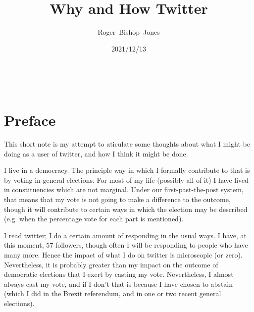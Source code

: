 \documentclass[10pt,titlepage]{article}
\title{\LARGE\bf Why and How Twitter}
\author{Roger~Bishop~Jones}
\date{\small 2021/12/13}
\newcommand{\ignore}[1]{}
\begin{document}
                               
\begin{titlepage}
\maketitle





\end{titlepage}

\ \

\ignore{
\begin{centering}
{}
\end{centering}
}%

\setcounter{tocdepth}{2}
{\parskip-0pt\tableofcontents}


\pagebreak

\section*{Preface}


This short note is my attempt to aticulate some thoughts about what I might be doing as a user of twitter, and how I think it might be done.

I live in a democracy.
The principle way in which I formally contribute to that is by voting in general elections.
For most of my life (possibly all of it) I have lived in constituencies which are not marginal.
Under our first-past-the-post system, that means that my vote is not going to make a difference to the outcome, though it will contribute to certain ways in which the election may be described (e.g. when the percentage vote for each part is mentioned).

I read twitter;  I do a certain amount of responding in the usual ways.
I have, at this moment, 57 followers, though often I will be responding to people who have many more.
Hence the impact of what I do on twitter is microscopic (or zero).
Nevertheless, it is probably greater than my impact on the outcome of democratic elections that I exert by casting my vote.
Nevertheless, I almost always cast my vote, and if I don't that is because I have chosen to abstain (which I did in the Brexit referendum, and in one or two recent general elections).
\end{document}

